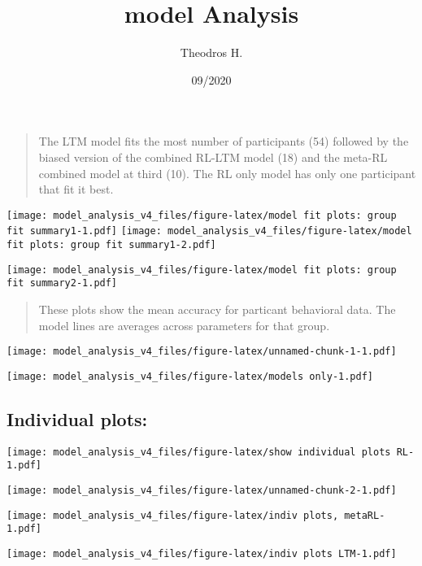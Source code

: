 \documentclass[]{article}
\title{model Analysis}
\author{Theodros H.}
\date{09/2020}
\begin{document}
\maketitle

\begin{quote}
The LTM model fits the most number of participants (54) followed by the
biased version of the combined RL-LTM model (18) and the meta-RL
combined model at third (10). The RL only model has only one participant
that fit it best.
\end{quote}

\texttt{[image: model\_analysis\_v4\_files/figure-latex/model fit plots: group fit summary1-1.pdf]}
\texttt{[image: model\_analysis\_v4\_files/figure-latex/model fit plots: group fit summary1-2.pdf]}

\texttt{[image: model\_analysis\_v4\_files/figure-latex/model fit plots: group fit summary2-1.pdf]}

\begin{quote}
These plots show the mean accuracy for particant behavioral data. The
model lines are averages across parameters for that group.
\end{quote}

\texttt{[image: model\_analysis\_v4\_files/figure-latex/unnamed-chunk-1-1.pdf]}

\texttt{[image: model\_analysis\_v4\_files/figure-latex/models only-1.pdf]}

\hypertarget{individual-plots}{%
\subsection{Individual plots:}\label{individual-plots}}

\texttt{[image: model\_analysis\_v4\_files/figure-latex/show individual plots RL-1.pdf]}

\texttt{[image: model\_analysis\_v4\_files/figure-latex/unnamed-chunk-2-1.pdf]}

\texttt{[image: model\_analysis\_v4\_files/figure-latex/indiv plots, metaRL-1.pdf]}

\texttt{[image: model\_analysis\_v4\_files/figure-latex/indiv plots LTM-1.pdf]}
\end{document}
